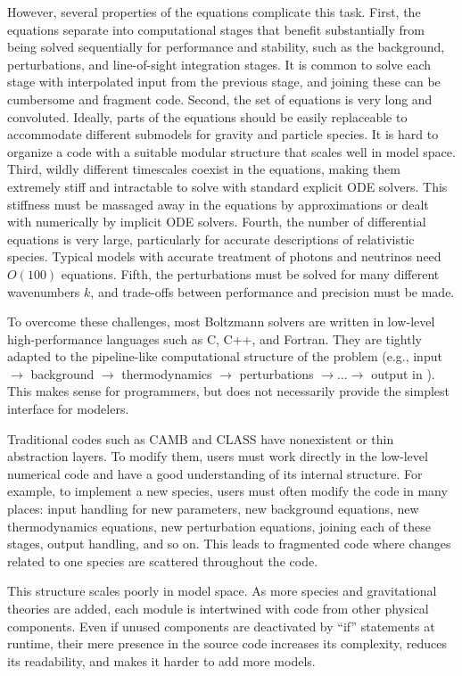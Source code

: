 \documentclass{aa}
\begin{document}
However, several properties of the equations complicate this task.
First, the equations separate into computational stages that benefit substantially from being solved sequentially for performance and stability, such as the background, perturbations, and line-of-sight integration stages.
It is common to solve each stage with interpolated input from the previous stage, and joining these can be cumbersome and fragment code.
Second, the set of equations is very long and convoluted.
Ideally, parts of the equations should be easily replaceable to accommodate different submodels for gravity and particle species.
It is hard to organize a code with a suitable modular structure that scales well in model space.
Third, wildly different timescales coexist in the equations, making them extremely stiff and intractable to solve with standard explicit ODE solvers.
This stiffness must be massaged away in the equations by approximations or dealt with numerically by implicit ODE solvers.
Fourth, the number of differential equations is very large, particularly for accurate descriptions of relativistic species.
Typical models with accurate treatment of photons and neutrinos need $O(100)$ equations.
Fifth, the perturbations must be solved for many different wavenumbers $k$, and trade-offs between performance and precision must be made.

To overcome these challenges, most Boltzmann solvers are written in low-level high-performance languages such as C, C++, and Fortran.
They are tightly adapted to the pipeline-like computational structure of the problem (e.g., input $\rightarrow$ background $\rightarrow$ thermodynamics $\rightarrow$ perturbations $\rightarrow \ldots \rightarrow$ output in \citealt{lesgourguesCosmicLinearAnisotropy2011}).
This makes sense for programmers, but does not necessarily provide the simplest interface for modelers.

Traditional codes such as CAMB and CLASS have nonexistent or thin abstraction layers.
To modify them, users must work directly in the low-level numerical code and have a good understanding of its internal structure.
For example, to implement a new species, users must often modify the code in many places: input handling for new parameters, new background equations, new thermodynamics equations, new perturbation equations, joining each of these stages, output handling, and so on.
This leads to fragmented code where changes related to one species are scattered throughout the code.

This structure scales poorly in model space.
As more species and gravitational theories are added, each module is intertwined with code from other physical components.
Even if unused components are deactivated by \enquote{if} statements at runtime, their mere presence in the source code increases its complexity, reduces its readability, and makes it harder to add more models.
\end{document}
